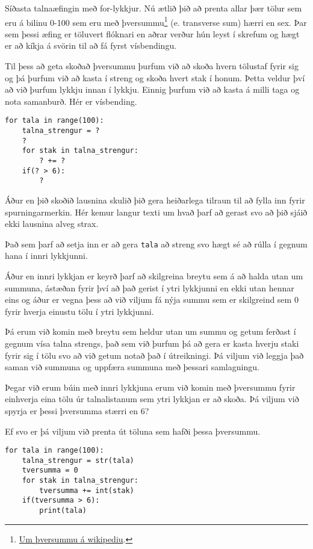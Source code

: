 \begin{exercise}\label{lyk4}
Síðasta talnaæfingin með for-lykkjur.
Nú ætlið þið að prenta allar þær tölur sem eru á bilinu 0-100 sem eru með þversummu\footnote{\href{https://is.wikipedia.org/wiki/\%C3\%9Eversumma}{Um þversummu á wikipediu}.} (e. transverse sum) hærri en sex.
Þar sem þessi æfing er töluvert flóknari en aðrar verður hún leyst í skrefum og hægt er að kíkja á svörin til að fá fyrst vísbendingu.
\end{exercise}
\begin{Answer}[ref={lyk4}]
Til þess að geta skoðað þversummu þurfum við að skoða hvern tölustaf fyrir sig og þá þurfum við að kasta í streng og skoða hvert stak í honum.
Þetta veldur því að við þurfum lykkju innan í lykkju.
Einnig þurfum við að kasta á milli taga og nota samanburð.
Hér er vísbending.
\begin{lstlisting}
for tala in range(100):
	talna_strengur = ?
	?
	for stak in talna_strengur:
		? += ?
	if(? > 6):
		?
\end{lstlisting}

Áður en þið skoðið lausnina skulið þið gera heiðarlega tilraun til að fylla inn fyrir spurningarmerkin.
Hér kemur langur texti um hvað þarf að gerast svo að þið sjáið ekki lausnina alveg strax.

Það sem þarf að setja inn er að gera \texttt{tala} að streng svo hægt sé að rúlla í gegnum hana í innri lykkjunni.

Áður en innri lykkjan er keyrð þarf að skilgreina breytu sem á að halda utan um summuna, ástæðan fyrir því að það gerist í ytri lykkjunni en ekki utan hennar eins og áður er vegna þess að við viljum fá nýja summu sem er skilgreind sem 0 fyrir hverja einustu tölu í ytri lykkjunni.

Þá erum við komin með breytu sem heldur utan um summu og getum ferðast í gegnum vísa talna strengs, það sem við þurfum þá að gera er kasta hverju staki fyrir sig í tölu svo að við getum notað það í útreikningi.
Þá viljum við leggja það saman við summuna og uppfæra summuna með þessari samlagningu.

Þegar við erum búin með innri lykkjuna erum við komin með þversummu fyrir einhverja eina tölu úr talnalistanum sem ytri lykkjan er að skoða.
Þá viljum við spyrja er þessi þversumma stærri en 6?

Ef svo er þá viljum við prenta út töluna sem hafði þessa þversummu.

\begin{lstlisting}
for tala in range(100):
	talna_strengur = str(tala)
	tversumma = 0
	for stak in talna_strengur:
		tversumma += int(stak)
	if(tversumma > 6):
		print(tala)\end{lstlisting}
\end{Answer}

